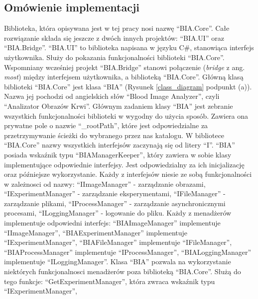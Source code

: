 \documentclass{article}
\begin{document}
        \subsection{Omówienie implementacji}
        {
            \label{omowienieimplementacji}
            \Large
            \justifying
            \quad
            Biblioteka, która opisywana jest w tej pracy nosi nazwę ``BIA.Core''.
            Całe rozwiązanie składa się jeszcze z dwóch innych projektów: ``BIA.UI'' oraz ``BIA.Bridge''.
            ``BIA.UI'' to biblioteka napisana w języku C\#, stanowiąca interfejs użytkownika. Służy do pokazania funkcjonalności biblioteki ``BIA.Core''.
            Wspomniany wcześniej projekt ``BIA.Bridge'' stanowi połączenie (\emph{bridge} z ang. \emph{most}) między interfejsem użytkownika, a biblioteką ``BIA.Core''.
            Główną klasą biblioteki ``BIA.Core'' jest klasa ``BIA'' (Rysunek \ref{class_diagram} podpunkt (a)).
            Nazwa jej pochodzi od angielskich słów ``Blood Image Analyzer'', czyli ``Analizator Obrazów Krwi''.
            Głównym zadaniem klasy ``BIA'' jest zebranie wszystkich funkcjonalności biblioteki w wygodny do użycia sposób.
            Zawiera ona prywatne pole o nazwie ``\_rootPath'', które jest odpowiedzialne za przetrzymywanie ścieżki do wybranego przez nas katalogu.
            W bibliotece ``BIA.Core'' nazwy wszystkich interfejsów zaczynają się od litery ``I''. 
            ``BIA'' posiada wskaźnik typu ``BIAManagerKeeper'', który zawiera w sobie klasy implementujące odpowiednie interfejsy.
            Jest odpowiedzialny za ich inicjalizację oraz późniejsze wykorzystanie.
            Każdy z interfejsów niesie ze sobą funkcjonalności w zależnosci od nazwy: 
            ``IImageManager'' - zarządzanie obrazami, ``IExperimentManager'' - zarządzanie eksperymentami,
            ``IFileManager'' - zarządzanie plikami, ``IProcessManager'' - zarządzanie asynchronicznymi procesami,
            ``ILoggingManager'' - logowanie do pliku.
            Każdy z menadżerów implementuje odpowiedni interfejs:
            ``BIAImageManager'' implementuje ``IImageManager'',
            ``BIAExperimentManager'' implementuje ``IExperimentManager'',
            ``BIAFileManager'' implementuje ``IFileManager'',
            ``BIAProcessManager'' implementuje ``IProcessManager'',
            ``BIALoggingManager'' implementuje ``ILoggingManager''.
            Klasa ``BIA'' pozwala na wykorzystanie niektórych funkcjonalnosci menadżerów poza biblioteką ``BIA.Core''.
            Służą do tego funkcje: ``GetExperimentManager'', która zwraca wskaźnik typu ``IExperimentManager'',
}
\end{document}
